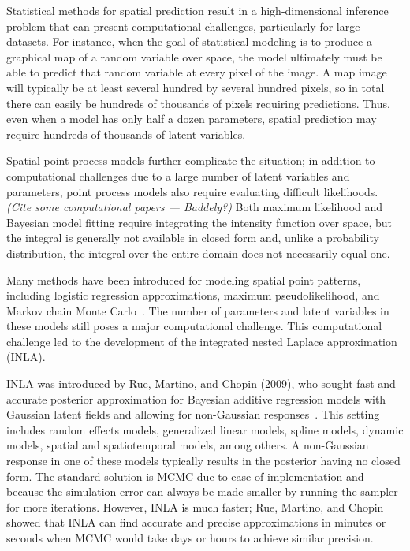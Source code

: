 \documentclass[]{interact}
\begin{document}

Statistical methods for spatial prediction result in a high-dimensional
inference problem that can present computational challenges, particularly for
large datasets. For instance, when the goal of statistical modeling is to
produce a graphical map of a random variable over space, the model ultimately
must be able to predict that random variable at every pixel of the image. A map
image will typically be at least several hundred by several hundred pixels, so
in total there can easily be hundreds of thousands of pixels requiring
predictions. Thus, even when a model has only half a dozen parameters, spatial
prediction may require hundreds of thousands of latent variables.

Spatial point process models further complicate the situation; in addition to
computational challenges due to a large number of latent variables and
parameters, point process models also require evaluating difficult likelihoods.
{\it (Cite some computational papers --- Baddely?)} Both maximum
likelihood and Bayesian model fitting require integrating the intensity
function over space, but the integral is generally not available in closed
form and, unlike a probability distribution, the integral over the entire
domain does not necessarily equal one.

Many methods have been introduced for modeling spatial point patterns,
including logistic regression approximations, maximum pseudolikelihood, and
Markov chain Monte
Carlo~\cite{bermanturner,baddeleyetal,baddeleyturner,moellerwaagepetersen}.
The number of parameters and latent variables in these models still poses a
major computational challenge. This computational challenge led to the
development of the integrated nested Laplace approximation (INLA).

INLA was introduced by Rue, Martino, and Chopin (2009), who sought fast and
accurate posterior approximation for Bayesian additive regression models with
Gaussian latent fields and allowing for non-Gaussian responses~\cite{rueetal}.
This setting includes random effects models, generalized linear models, spline
models, dynamic models, spatial and spatiotemporal models, among others.
A non-Gaussian response in one of these models typically results in the
posterior having no closed form. The standard solution is MCMC due to ease of
implementation and because the simulation error can always be made smaller by
running the sampler for more iterations. However, INLA is much faster; Rue,
Martino, and Chopin showed that INLA can find accurate and precise
approximations in minutes or seconds when MCMC would take days or hours to
achieve similar precision.
\end{document}
